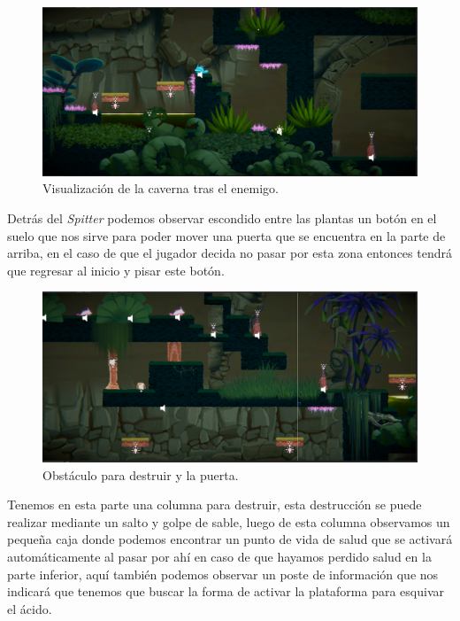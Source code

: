 \documentclass[a4paper,12pt]{article}
\begin{document}
    \begin{figure}[ht]
        \centering                \includegraphics[width=1\textwidth]{images/CaptureIDSE03.PNG}
        \caption{Visualización de la caverna tras el enemigo.}
    \end{figure}  

    Detrás del \textit{Spitter} podemos observar escondido entre las plantas un botón en el suelo que nos sirve para poder mover una puerta que se encuentra en la parte de arriba, en el caso de que el jugador decida no pasar por esta zona entonces tendrá que regresar al inicio y pisar este botón.

    \begin{figure}[ht]
        \centering                \includegraphics[width=1\textwidth]{images/CaptureIDSE04.PNG}
        \caption{Obstáculo para destruir y la puerta.}
    \end{figure}  
    
    Tenemos en esta parte una columna para destruir, esta destrucción se puede realizar mediante un salto y golpe de sable, luego de esta columna observamos un pequeña caja donde podemos encontrar un punto de vida de salud que se activará automáticamente al pasar por ahí en caso de que hayamos perdido salud en la parte inferior, aquí también podemos observar un poste de información que nos indicará que tenemos que buscar la forma de activar la plataforma para esquivar el ácido.
\end{document}

